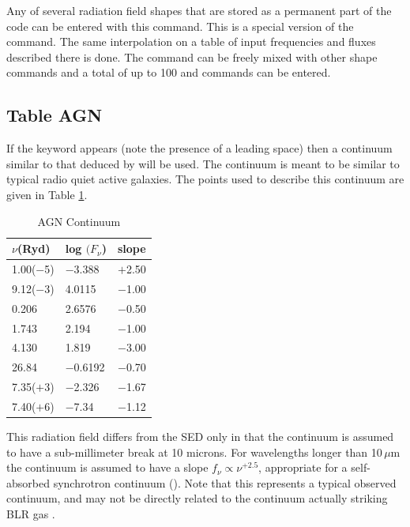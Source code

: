 Any of several radiation field shapes that are stored as a permanent part
of the code can be entered with this command.
This is a special version of
the  command.
The same interpolation
on a table of input frequencies and fluxes described there is done.
The  command can be freely mixed with other
shape commands and a total
of up to 100  and  commands
can be entered.

\subsection{Table AGN }
\noindent If the keyword  appears
(note the presence of a leading space) then
a continuum similar to that deduced by \citet{Mathews1987} will be
used.  The continuum is meant to be similar to typical radio quiet active
galaxies.
The points used to describe this continuum are given in
Table \ref{tab:AGNcontinuum}.

\begin{table}
\centering
\caption{AGN Continuum}
\begin{tabular}{lll}\hline
\label{tab:AGNcontinuum}
$\nu$(Ryd)& log $(F_\nu$)& slope\\
\hline
1.00($-$5)&$-$3.388& $+$2.50\\
9.12($-$3)&4.0115& $-$1.00\\
0.206& 2.6576& $-$0.50\\
1.743& 2.194& $-$1.00\\
4.130& 1.819& $-$3.00\\
26.84& $-$0.6192& $-$0.70\\
7.35($+$3)& $-$2.326& $-$1.67\\
7.40($+$6)& $-$7.34& $-$1.12\\
\hline
\end{tabular}
\end{table}

This radiation field differs from the \citet{Mathews1987} SED
only in that the continuum is assumed to have a sub-millimeter break at
10 microns.
For wavelengths longer than 10\,$\mu$m the continuum is assumed
to have a slope $f_\nu\propto \nu^{+2.5}$,
appropriate for a self-absorbed synchrotron
continuum (\citealp{Rybicki1979}).
Note that this represents a typical
observed continuum,
and may not be directly related to the continuum actually
striking BLR gas \citep{KoristaFerlandBaldwin1997}.

